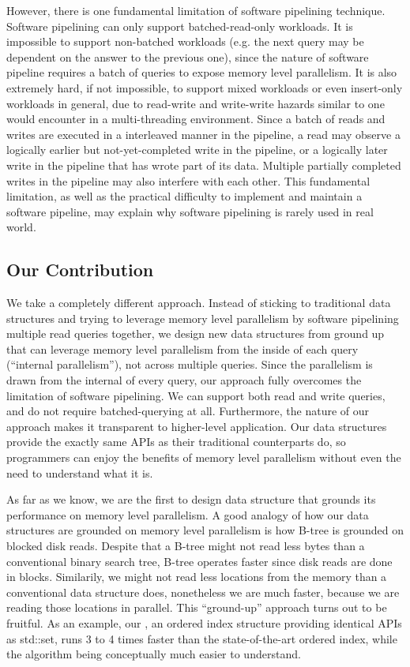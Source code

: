 \documentclass[11pt, usletter]{article}
\begin{document}
However, there is one fundamental limitation of software pipelining technique. 
Software pipelining can only support batched-read-only workloads. 
It is impossible to support non-batched workloads (e.g. the next query may be dependent on the answer to the previous one), 
since the nature of software pipeline requires a batch of queries to expose memory level parallelism. 
It is also extremely hard, if not impossible, to support mixed workloads or even insert-only workloads in general, 
due to read-write and write-write hazards similar to one would encounter in a multi-threading environment.
Since a batch of reads and writes are executed in a interleaved manner in the pipeline,
a read may observe a logically earlier but not-yet-completed write in the pipeline, 
or a logically later write in the pipeline that has wrote part of its data.
Multiple partially completed writes in the pipeline may also interfere with each other.
This fundamental limitation, 
as well as the practical difficulty to implement and maintain a software pipeline, 
may explain why software pipelining is rarely used in real world.

\subsection{Our Contribution}

We take a completely different approach. 
Instead of sticking to traditional data structures 
and trying to leverage memory level parallelism by software pipelining multiple read queries together, 
we design new data structures from ground up that can leverage memory level parallelism 
from the inside of each query (``internal parallelism''), not across multiple queries. 
Since the parallelism is drawn from the internal of every query, 
our approach fully overcomes the limitation of software pipelining.
We can support both read and write queries, and do not require batched-querying at all. 
Furthermore, the nature of our approach makes it transparent to higher-level application. 
Our data structures provide the exactly same APIs as their traditional counterparts do, 
so programmers can enjoy the benefits of memory level parallelism without even the need to understand what it is.

As far as we know, we are the first to design data structure that grounds its performance on memory level parallelism.
A good analogy of how our data structures are grounded on memory level parallelism 
is how B-tree is grounded on blocked disk reads. 
Despite that a B-tree might not read less bytes than a conventional binary search tree, 
B-tree operates faster since disk reads are done in blocks. 
Similarily, we might not read less locations from the memory than a conventional data structure does, 
nonetheless we are much faster, because we are reading those locations in parallel.
This ``ground-up'' approach turns out to be fruitful. 
As an example, our \MlpIndex, an ordered index structure providing identical APIs as std::set, 
runs 3 to 4 times faster than the state-of-the-art ordered index, 
while the algorithm being conceptually much easier to understand.
\end{document}

